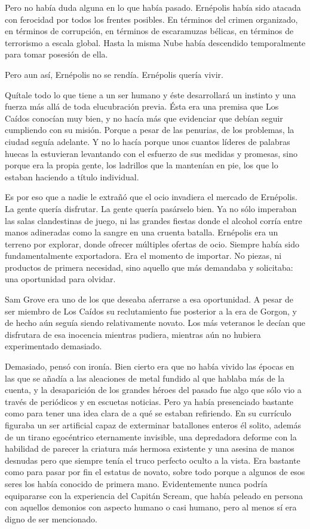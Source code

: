 Pero no había duda alguna en lo que había pasado. Ernépolis había sido atacada con ferocidad por todos los frentes posibles. En términos del crimen organizado, en términos de corrupción, en términos de escaramuzas bélicas, en términos de terrorismo a escala global. Hasta la misma Nube había descendido temporalmente para tomar posesión de ella.

Pero aun así, Ernépolis no se rendía. Ernépolis quería vivir.

Quítale todo lo que tiene a un ser humano y éste desarrollará un instinto y una fuerza más allá de toda elucubración previa. Ésta era una premisa que Los Caídos conocían muy bien, y no hacía más que evidenciar que debían seguir cumpliendo con su misión. Porque a pesar de las penurias, de los problemas, la ciudad seguía adelante. Y no lo hacía porque unos cuantos líderes de palabras huecas la estuvieran levantando con el esfuerzo de sus medidas y promesas, sino porque era la propia gente, los ladrillos que la mantenían en pie, los que lo estaban haciendo a título individual.

Es por eso que a nadie le extrañó que el ocio invadiera el mercado de Ernépolis. La gente quería disfrutar. La gente quería pasárselo bien. Ya no sólo imperaban las salas clandestinas de juego, ni las grandes fiestas donde el alcohol corría entre manos adineradas como la sangre en una cruenta batalla. Ernépolis era un terreno por explorar, donde ofrecer múltiples ofertas de ocio. Siempre había sido fundamentalmente exportadora. Era el momento de importar. No piezas, ni productos de primera necesidad, sino aquello que más demandaba y solicitaba: una oportunidad para olvidar.

Sam Grove era uno de los que deseaba aferrarse a esa oportunidad. A pesar de ser miembro de Los Caídos su reclutamiento fue posterior a la era de Gorgon, y de hecho aún seguía siendo relativamente novato. Los más veteranos le decían que disfrutara de esa inocencia mientras pudiera, mientras aún no hubiera experimentado demasiado.

Demasiado, pensó con ironía. Bien cierto era que no había vivido las épocas en las que se añadía a las aleaciones de metal fundido al que hablaba más de la cuenta, y la desaparición de los grandes héroes del pasado fue algo que sólo vio a través de periódicos y en escuetas noticias. Pero ya había presenciado bastante como para tener una idea clara de a qué se estaban refiriendo. En su currículo figuraba un ser artificial capaz de exterminar batallones enteros él solito, además de un tirano egocéntrico eternamente invisible, una depredadora deforme con la habilidad de parecer la criatura más hermosa existente y una asesina de manos desnudas pero que siempre tenía el truco perfecto oculto a la vista. Era bastante como para pasar por fin el estatus de novato, sobre todo porque a algunos de esos seres los había conocido de primera mano. Evidentemente nunca podría equipararse con la experiencia del Capitán Scream, que había peleado en persona con aquellos demonios con aspecto humano o casi humano, pero al menos sí era digno de ser mencionado.

